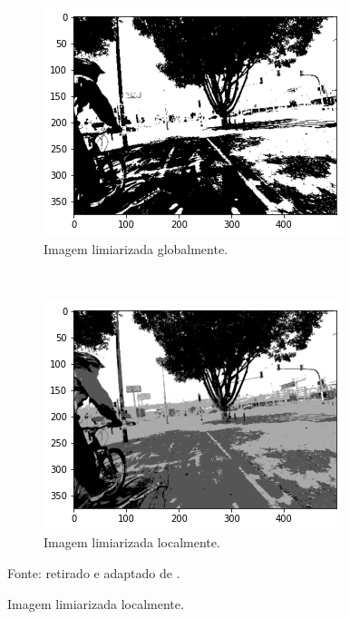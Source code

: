 \begin{figure}[H]
    \begin{subfigure}[t]{0.45\textwidth}
        \centering
        \includegraphics[width=1\linewidth]{recursos/imagens/image_seg/bw_mapi.png}
        \caption{Imagem limiarizada globalmente.}
        \label{segment:fig:3.3}
    \end{subfigure}
    ~
    \begin{subfigure}[t]{0.45\textwidth}
        \centering
        \includegraphics[width=1\linewidth]{recursos/imagens/image_seg/local_mapi.png}
        \caption{Imagem limiarizada localmente.}
        \label{segment:fig:3.4}
    \end{subfigure}

    Fonte: retirado e adaptado de \cite{Neuhold2017_ICCV}.
\end{figure}

